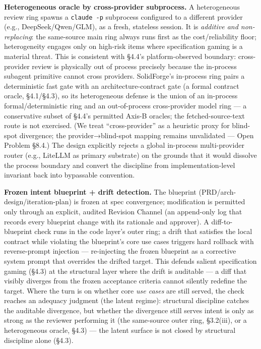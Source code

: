 \documentclass[
  11pt,
]{article}
\begin{document}
\textbf{Heterogeneous oracle by cross-provider subprocess.} A
heterogeneous review ring spawns a \texttt{claude\ -p} subprocess
configured to a different provider (e.g., DeepSeek/Qwen/GLM), as a
fresh, stateless session. It is \emph{additive and non-replacing}: the
same-source main ring always runs first as the cost/reliability floor;
heterogeneity engages only on high-risk items where specification gaming
is a material threat. This is consistent with §4.4's platform-observed
boundary: cross-provider review is physically out of process precisely
because the in-process subagent primitive cannot cross providers.
SolidForge's in-process ring pairs a deterministic fast gate with an
architecture-contract gate (a formal contract oracle, §4.1/§4.3), so its
heterogeneous defense is the union of an in-process formal/deterministic
ring and an out-of-process cross-provider model ring --- a conservative
subset of §4.4's permitted Axis-B oracles; the fetched-source-text route
is not exercised. (We treat ``cross-provider'' as a heuristic proxy for
blind-spot divergence; the provider→blind-spot mapping remains
unvalidated --- Open Problem §8.4.) The design explicitly rejects a
global in-process multi-provider router (e.g., LiteLLM as primary
substrate) on the grounds that it would dissolve the process boundary
and convert the discipline from implementation-level invariant back into
bypassable convention.

\textbf{Frozen intent blueprint + drift detection.} The blueprint
(PRD/arch-design/iteration-plan) is frozen at spec convergence;
modification is permitted only through an explicit, audited Revision
Channel (an append-only log that records every blueprint change with its
rationale and approver). A diff-to-blueprint check runs in the code
layer's outer ring; a drift that satisfies the local contract while
violating the blueprint's core use cases triggers hard rollback with
reverse-prompt injection --- re-injecting the frozen blueprint as a
corrective system prompt that overrides the drifted target. This defends
salient specification gaming (§4.3) at the structural layer where the
drift is auditable --- a diff that visibly diverges from the frozen
acceptance criteria cannot silently redefine the target. Where the turn
is on whether core \emph{use cases} are still served, the check reaches
an adequacy judgment (the latent regime): structural discipline catches
the auditable divergence, but whether the divergence still serves intent
is only as strong as the reviewer performing it (the same-source outer
ring, §3.2(iii), or a heterogeneous oracle, §4.3) --- the latent surface
is not closed by structural discipline alone (§4.3).
\end{document}
